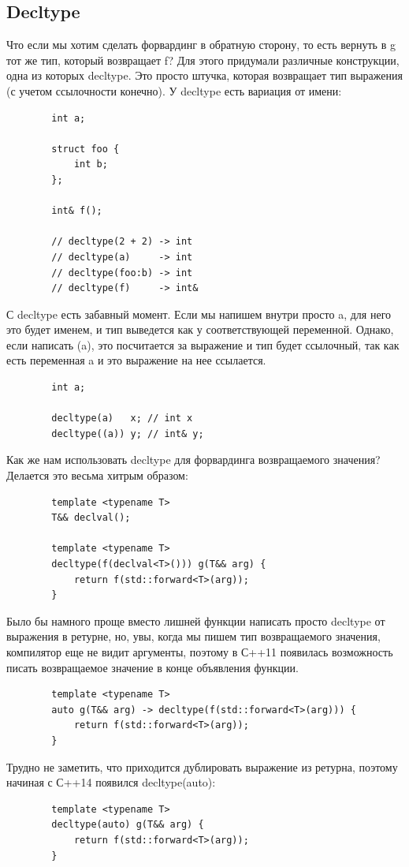 \documentclass[12pt, a4paper]{article}
\begin{document}
	\subsection{Decltype}
	Что если мы хотим сделать форвардинг в обратную сторону, то есть вернуть в g тот же тип, который возвращает f? Для этого придумали различные конструкции, одна из которых decltype. Это просто штучка, которая возвращает тип выражения (с учетом ссылочности конечно). У decltype есть вариация от имени:
	\begin{verbatim}
		int a;
		
		struct foo {
			int b;
		};
		
		int& f();
		
		// decltype(2 + 2) -> int
		// decltype(a)     -> int
		// decltype(foo:b) -> int
		// decltype(f)     -> int&
	\end{verbatim}
	С decltype есть забавный момент. Если мы напишем внутри просто a, для него это будет именем, и тип выведется как у соответствующей переменной. Однако, если написать (a), это посчитается за выражение и тип будет ссылочный, так как есть переменная a и это выражение на нее ссылается.
	\begin{verbatim}
		int a;
		
		decltype(a)   x; // int x
		decltype((a)) y; // int& y;
	\end{verbatim}
	Как же нам использовать decltype для форвардинга возвращаемого значения? Делается это весьма хитрым образом:
	\begin{verbatim}
		template <typename T>
		T&& declval();
		
		template <typename T>
		decltype(f(declval<T>())) g(T&& arg) {
			return f(std::forward<T>(arg));
		}
	\end{verbatim}
	Было бы намного проще вместо лишней функции написать просто decltype от выражения в ретурне, но, увы, когда мы пишем тип возвращаемого значения, компилятор еще не видит аргументы, поэтому в С++11 появилась возможность писать возвращаемое значение в конце объявления функции.
	\begin{verbatim}
		template <typename T>
		auto g(T&& arg) -> decltype(f(std::forward<T>(arg))) {
			return f(std::forward<T>(arg));
		}
	\end{verbatim}
	Трудно не заметить, что приходится дублировать выражение из ретурна, поэтому начиная с С++14 появился decltype(auto):
	\begin{verbatim}
		template <typename T>
		decltype(auto) g(T&& arg) {
			return f(std::forward<T>(arg));
		}
	\end{verbatim}
\end{document}
